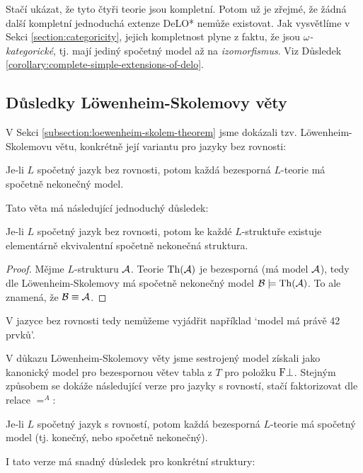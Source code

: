Stačí ukázat, že tyto čtyři teorie jsou kompletní. Potom už je zřejmé, že žádná další kompletní jednoduchá extenze DeLO* nemůže existovat. Jak vysvětlíme v Sekci \ref{section:categoricity}, jejich kompletnost plyne z faktu, že jsou \emph{$\omega$-kategorické}, tj. mají jediný spočetný model až na \emph{izomorfismus}. Viz Důsledek \ref{corollary:complete-simple-extensions-of-delo}.


\subsection{Důsledky Löwenheim-Skolemovy věty}

V Sekci \ref{subsection:loewenheim-skolem-theorem} jsme dokázali tzv. Löwenheim-Skolemovu větu, konkrétně její variantu pro jazyky bez rovnosti:

\begin{theorem-unnumbered}
    Je-li $L$ spočetný jazyk bez rovnosti, potom každá bezesporná $L$-teorie má spočetně nekonečný model.
\end{theorem-unnumbered}

Tato věta má následující jednoduchý důsledek:

\begin{corollary}\label{corollary:loewenheim-skolem-without-equality}
    Je-li $L$ spočetný jazyk bez rovnosti, potom ke každé $L$-struktuře existuje elementárně ekvivalentní spočetně nekonečná struktura.
\end{corollary}
\begin{proof}
    Mějme $L$-strukturu $\mathcal{A}$. Teorie $\operatorname{Th}(\mathcal{A})$ je bezesporná (má model $\mathcal{A}$), tedy dle Löwenheim-Skolemovy má spočetně nekonečný model $\mathcal{B}\models\operatorname{Th}(\mathcal{A})$. To ale znamená, že $\mathcal{B}\equiv\mathcal{A}$.
\end{proof}
V jazyce bez rovnosti tedy nemůžeme vyjádřit například `model má právě 42 prvků'.

V důkazu Löwenheim-Skolemovy věty jsme sestrojený model získali jako kanonický model pro bezespornou větev tabla z $T$ pro položku $\mathrm{F}\bot$. Stejným způsobem se dokáže následující verze pro jazyky s rovností, stačí faktorizovat dle relace $=^A$:

\begin{theorem-unnumbered}
    Je-li $L$ spočetný jazyk s rovností, potom každá bezesporná $L$-teorie má spočetný model (tj. konečný, nebo spočetně nekonečný).
\end{theorem-unnumbered}

I tato verze má snadný důsledek pro konkrétní struktury:

